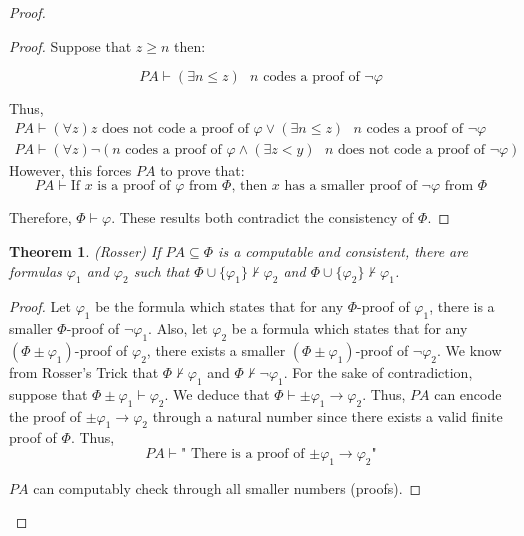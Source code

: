 \documentclass[a4paper,10pt]{article}
\newtheorem{theorem}{Theorem}[section]
\let\phi\varphi
\newcommand*\map{\rightarrow}
\newcommand*\n{\newline\par}
\newcommand*\prf{\vdash}
\newcommand*\np{\neg\phi}
\newcommand*\notprf{\not\vdash}
\begin{document}
\begin{proof}
\begin{proof}
   Suppose that $z \geq n$ then:
   
   \begin{equation*}
    PA \prf (\exists n \leq z) \text{ $n$ codes a proof of $\neg \phi$}
   \end{equation*}

   Thus,
   \begin{gather*}
    PA \prf (\forall z)\text{$z$ does not code a proof of $\phi$}  \lor (\exists n \leq z) \text{ $n$ codes a proof of $\neg \phi$} \\
    PA \prf (\forall z) \neg(\text{$n$ codes a proof of $\phi$}  \land (\exists z < y) \text{ $n$ does not code a proof of $\neg \phi$})
   \end{gather*}
   However, this forces $PA$ to prove that:
   \begin{equation*}
    PA \prf \text{If $x$ is a proof of $\phi$ from $\Phi$, then $x$ has a smaller proof of $\np$ from $\Phi$}
   \end{equation*}
   
   Therefore, $\Phi \prf \phi$. These results both contradict the consistency of $\Phi$.
  \end{proof}

  \begin{theorem}
   (Rosser)
   If $PA \subseteq \Phi$ is a computable and consistent, there are formulas $\phi_1$ and $\phi_2$ such that $\Phi \cup \{\phi_1\} \notprf \phi_2$ and $\Phi \cup \{\phi_2\} \notprf \phi_1$.
  \end{theorem}
  
  \begin{proof}
    Let $\phi_1$ be the formula which states that for any $\Phi$-proof of $\phi_1$, there is a smaller $\Phi$-proof of $\neg\phi_1$. Also, let $\phi_2$ be a formula which states that for any $(\Phi\pm\phi_1)$-proof of $\phi_2$, there exists a 
    smaller $(\Phi\pm\phi_1)$-proof of $\neg\phi_2$. We know from Rosser's Trick that $\Phi \not\prf \phi_1$ and $\Phi \not\prf \neg\phi_1$. For the sake of contradiction, suppose that 
    $\Phi\pm\phi_1\prf\phi_2$. We deduce that $\Phi\prf\pm\phi_1\map\phi_2$. Thus, $PA$ can encode the proof of $\pm\phi_1\map\phi_2$ through a natural number since there exists a valid finite proof of $\Phi$. Thus,
    \begin{equation*}
      PA \prf \text{" There is a proof of $\pm\phi_1\map\phi_2$"}
    \end{equation*}

    $PA$ can computably check through all smaller numbers (proofs). \n
    

\end{proof}
\end{proof}
\end{document}
